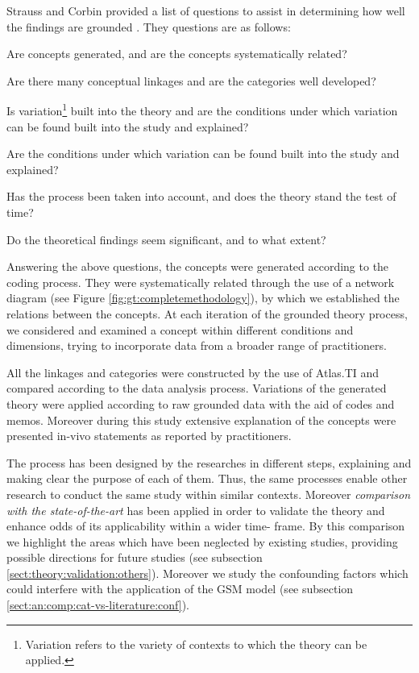 \documentclass[10pt,journal,letterpaper,compsoc]{IEEEtran}
\begin{document}
Strauss and Corbin provided a list of questions to assist in  determining how
well the findings are grounded \cite{Strauss1998}. They  questions are as
follows:

\par\vspace {0.4cm} 
\begin{compactenum} 
\item Are concepts generated, and are the concepts systematically related? 
\item Are there many conceptual linkages and are the categories well developed? 
\item Is variation\footnote{Variation refers to the variety of contexts to  
which the theory can be applied.} built into the theory and are the conditions  
under which variation can be found built into the study and explained? 
\item Are the conditions under which variation can be found built into the  
study and explained? 
\item Has the process been taken into account, and does the theory stand the  
test of time? 
\item Do the theoretical findings seem significant, and to what extent? 
\end{compactenum}
\par\vspace {0.4cm}

Answering the above questions, the concepts were generated according to the
coding process. They were systematically related through the use of a network
diagram (see Figure \ref{fig:gt:completemethodology}), by which we established
the relations between the concepts. At each iteration of the  grounded theory
process, we considered and examined a concept within different  conditions and
dimensions, trying to incorporate data from a broader range of  practitioners.

All the linkages and categories were constructed by the use of Atlas.TI and
compared according to the data analysis process. Variations of the generated
theory were applied according to raw grounded data with the aid of codes and
memos. Moreover during this study extensive explanation of the concepts were
presented in-vivo statements as reported by practitioners.

The process has been designed by the researches in different steps, explaining
and making clear the purpose of each of them. Thus, the same processes enable
other research to conduct the same study within similar contexts. Moreover
\textit{comparison with the state-of-the-art} has been applied in order to
validate the theory and enhance odds of its applicability within a wider  time-
frame. By this comparison we  highlight the areas which have been neglected  by
existing studies, providing possible directions for future studies (see
subsection \ref{sect:theory:validation:others}). Moreover we study the
confounding factors which could interfere with the application of the GSM model
(see subsection \ref{sect:an:comp:cat-vs-literature:conf}).
\end{document}
